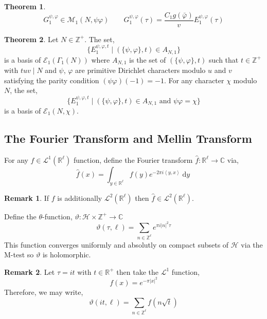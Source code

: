 \documentclass{article}
\newcommand{\divides}{\mid}
\newcommand{\Z}{\mathbb{Z}}
\newcommand{\R}{\mathbb{R}}
\newcommand{\C}{\mathbb{C}}
\newcommand{\Zplus}{\mathbb{Z}^{+}}
\renewcommand{\d}[1]{\: \mathrm{d}#1 \:}
\theoremstyle{definition}
\newtheorem{theorem}{Theorem}[section]
\newtheorem{remark}{Remark}[section]
\newenvironment{definition}[1][Definition:]{\begin{trivlist}
\item[\hskip \labelsep {\bfseries #1}]}{\end{trivlist}}
\newcommand{\M}[1]{\mathcal{M}_{#1}}
\newcommand{\E}[1]{\mathcal{E}_{#1}}
\newcommand{\half}{\mathcal{H}}
\begin{document}
\begin{theorem}
\[ G_1^{\psi, \varphi} \in \M{1}(N, \psi \varphi) \quad \quad G_1^{\psi, \varphi}(\tau) = \frac{C_1 g(\bar{\varphi})}{v} E_1^{\psi, \varphi}(\tau) \]
\end{theorem}

\begin{theorem}
Let $N \in \Zplus$. The set,
\[ \{ E_1^{\psi, \varphi, t} \mid (\{ \psi, \varphi \}, t) \in A_{N, 1} \} \]
is a basis of $\E{1}(\Gamma_1(N))$
where $A_{N,1}$ is the set of $(\{ \psi, \varphi \}, t)$ such that $t \in \Zplus$ with $tuv \divides N$ and $\psi$, $\varphi$ are primitive Dirichlet characters modulo $u$ and $v$ satisfying the parity condition $(\psi \varphi)(-1) = -1$. For any character $\chi$ modulo $N$, the set,
\[ \{ E_1^{\psi, \varphi, t} \mid (\{ \psi, \varphi \}, t) \in A_{N, 1} \text{ and } \psi \varphi = \chi \} \]
is a basis of $\E{1}(N, \chi)$. 
\end{theorem}

\subsection{The Fourier Transform and Mellin Transform}

\renewcommand{\L}{\mathcal{L}}
\newcommand{\inner}[2]{\left< #1, #2 \right>}

\begin{definition}
For any $f \in \L^1(\R^\ell)$ function, define the Fourier transform $\hat{f} : \R^\ell \to \C$ via,
\[ \hat{f}(x) = \int_{y \in \R^{\ell}} f(y) e^{-2\pi i \inner{y}{x}} \d{y} \]
\end{definition}

\begin{remark}
If $f$ is additionally $\L^2(\R^\ell)$ then $\hat{f} \in \L^2(\R^\ell)$.
\end{remark}

\newcommand{\vt}{\vartheta}

\begin{definition}
Define the $\theta$-function, $\vt : \half \times \Zplus \to \C$
\[ \vt(\tau, \ell) = \sum_{n \in \Z^{\ell}} e^{\pi i |n|^2 \tau} \]
This function converges uniformly and absolutly on compact subsets of $\half$ via the M-test so $\vt$ is holomorphic. 
\end{definition}

\begin{remark}
Let $\tau = i t$ with $t \in \R^+$ then take the $\L^1$ function,
\[ f(x) = e^{- \pi |x|^2} \]
Therefore, we may write,
\[ \vt(it, \ell) = \sum_{n \in \Z^\ell} f(n \sqrt{t}) \]
\end{remark}
\end{document}
